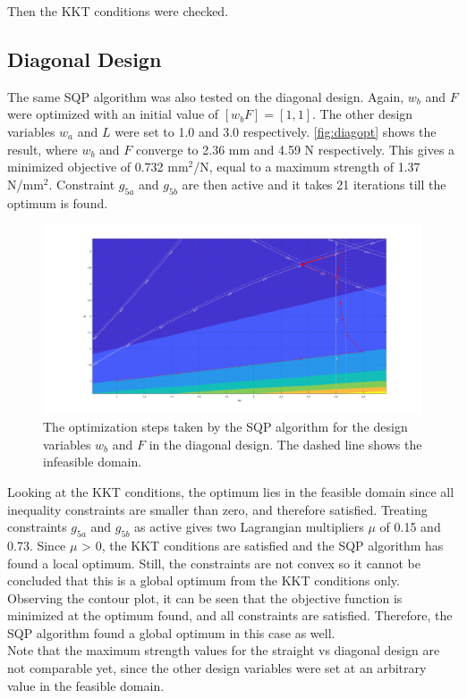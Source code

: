 Then the KKT conditions were checked. 
\subsection{Diagonal Design}
The same SQP algorithm was also tested on the diagonal design. Again, $w_b$ and $F$ were optimized with an initial value of $[w_b F] = [1, 1]$. The other design variables $w_a$ and $L$ were set to 1.0 and 3.0 respectively. \autoref{fig:diagopt} shows the result, where $w_b$ and $F$ converge to 2.36 mm and 4.59 N respectively. This gives a minimized objective of 0.732 mm$^2$/N, equal to a maximum strength of 1.37 N/mm$^2$. Constraint $g_{5a}$ and $g_{5b}$ are then active and it takes 21 iterations till the optimum is found.


\begin{figure}[H]
	\centering
	\includegraphics[width=\columnwidth]{sources/plots/diagonal2var.png}
	\caption{The optimization steps taken by the SQP algorithm for the design variables $w_b$ and $F$ in the diagonal design. The dashed line shows the infeasible domain.}
	\label{fig:diagopt}
\end{figure}

Looking at the KKT conditions, the optimum lies in the feasible domain since all inequality constraints are smaller than zero, and therefore satisfied. Treating constraints $g_{5a}$ and $g_{5b}$ as active gives two Lagrangian multipliers $\mu$ of 0.15 and 0.73. Since $\mu$ > 0, the KKT conditions are satisfied and the SQP algorithm has found a local optimum. Still, the constraints are not convex so it cannot be concluded that this is a global optimum from the KKT conditions only. Observing the contour plot, it can be seen that the objective function is minimized at the optimum found, and all constraints are satisfied. Therefore, the SQP algorithm found a global optimum in this case as well.\\

Note that the maximum strength values for the straight vs diagonal design are not comparable yet, since the other design variables were set at an arbitrary value in the feasible domain.








